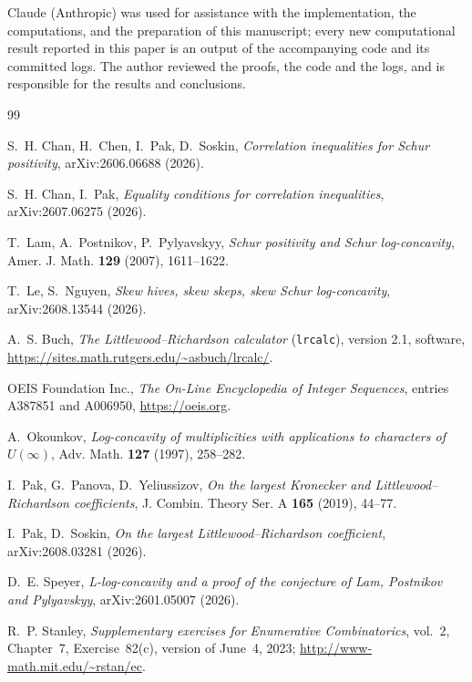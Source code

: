 \documentclass[11pt]{article}
\theoremstyle{remark}
\begin{document}
Claude (Anthropic) was used for assistance with the implementation, the computations,
and the preparation of this manuscript; every new computational result reported in this paper is an output of the
accompanying code and its committed logs. The author reviewed the proofs, the code and
the logs, and is responsible for the results and conclusions.

\begin{thebibliography}{99}

S.~H. Chan, H.~Chen, I.~Pak, D.~Soskin,
\emph{Correlation inequalities for Schur positivity},
arXiv:2606.06688 (2026).

S.~H. Chan, I.~Pak,
\emph{Equality conditions for correlation inequalities},
arXiv:2607.06275 (2026).

T.~Lam, A.~Postnikov, P.~Pylyavskyy,
\emph{Schur positivity and Schur log-concavity},
Amer. J. Math. \textbf{129} (2007), 1611--1622.

T.~Le, S.~Nguyen,
\emph{Skew hives, skew skeps, skew Schur log-concavity},
arXiv:2608.13544 (2026).

A.~S. Buch,
\emph{The Littlewood--Richardson calculator} (\texttt{lrcalc}), version 2.1,
software, \url{https://sites.math.rutgers.edu/~asbuch/lrcalc/}.

OEIS Foundation Inc.,
\emph{The On-Line Encyclopedia of Integer Sequences}, entries A387851 and A006950,
\url{https://oeis.org}.

A.~Okounkov,
\emph{Log-concavity of multiplicities with applications to characters of $U(\infty)$},
Adv. Math. \textbf{127} (1997), 258--282.

I.~Pak, G.~Panova, D.~Yeliussizov,
\emph{On the largest Kronecker and Littlewood--Richardson coefficients},
J. Combin. Theory Ser. A \textbf{165} (2019), 44--77.

I.~Pak, D.~Soskin,
\emph{On the largest Littlewood--Richardson coefficient},
arXiv:2608.03281 (2026).

D.~E. Speyer,
\emph{L-log-concavity and a proof of the conjecture of Lam, Postnikov and Pylyavskyy},
arXiv:2601.05007 (2026).

R.~P. Stanley,
\emph{Supplementary exercises for Enumerative Combinatorics}, vol.~2, Chapter~7,
Exercise~82(c), version of June~4, 2023;
\url{http://www-math.mit.edu/~rstan/ec}.

\end{thebibliography}
\end{document}
